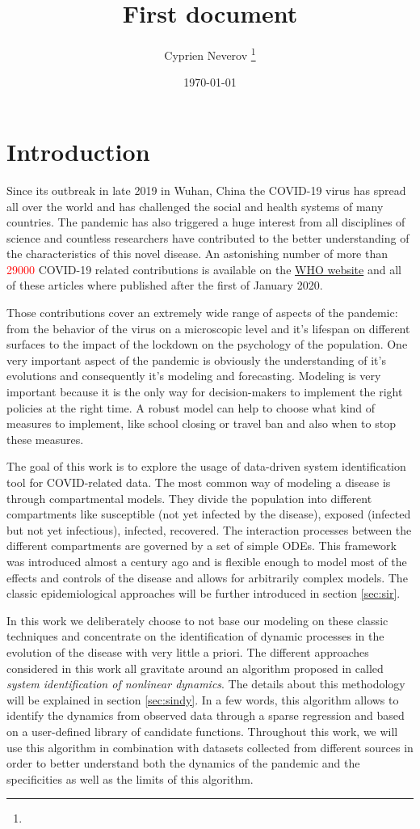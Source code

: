 \documentclass[12pt, letterpaper]{article}
\title{First document}
\author{Cyprien Neverov \thanks{}}
\date{\today}
\newcommand{\com}[1]{{\small {\fontfamily{ptm} \selectfont \textcolor{red}{#1}}}}
\begin{document}
\tableofcontents


\section{Introduction}
Since its outbreak in late 2019 in Wuhan, China the COVID-19 virus has spread all over the world and has challenged the social and health systems of many countries. 
The pandemic has also triggered a huge interest from all disciplines of science and countless researchers have contributed to the better understanding of the characteristics of this novel disease. 
An astonishing number of more than \com{29000} COVID-19 related contributions is available on the \href{https://search.bvsalud.org/global-literature-on-novel-coronavirus-2019-ncov/}{WHO website} and all of these articles where published after the first of January 2020.

Those contributions cover an extremely wide range of aspects of the pandemic: from the behavior of the virus on a microscopic level and it's lifespan on different surfaces to the impact of the lockdown on the psychology of the population. 
One very important aspect of the pandemic is obviously the understanding of it's evolutions and consequently it's modeling and forecasting. 
Modeling is very important because it is the only way for decision-makers to implement the right policies at the right time. 
A robust model can help to choose what kind of measures to implement, like school closing or travel ban and also when to stop these measures.

The goal of this work is to explore the usage of data-driven system identification tool for COVID-related data. 
The most common way of modeling a disease is through compartmental models. 
They divide the population into different compartments like susceptible (not yet infected by the disease), exposed (infected but not yet infectious), infected, recovered. 
The interaction processes between the different compartments are governed by a set of simple ODEs. 
This framework was introduced almost a century ago and is flexible enough to model most of the effects and controls of the disease and allows for arbitrarily complex models. 
The classic epidemiological approaches will be further introduced in section \ref{sec:sir}.

In this work we deliberately choose to not base our modeling on these classic techniques and concentrate on the identification of dynamic processes in the evolution of the disease with very little a priori.
The different approaches considered in this work all gravitate around an algorithm proposed in \cite{sindy} called {\em system identification of nonlinear dynamics}. 
The details about this methodology will be explained in section \ref{sec:sindy}. 
In a few words, this algorithm allows to identify the dynamics from observed data through a sparse regression and based on a user-defined library of candidate functions. 
Throughout this work, we will use this algorithm in combination with datasets collected from different sources in order to better understand both the dynamics of the pandemic and the specificities as well as the limits of this algorithm. 
\end{document}
